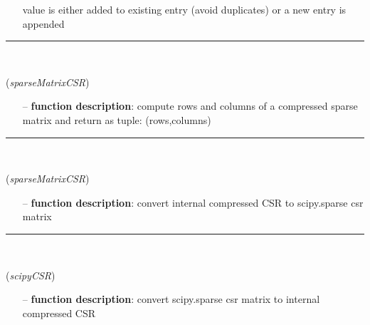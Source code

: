 \begin{itemize}[leftmargin=1.4cm]
\begin{itemize}[leftmargin=0.5cm]
\begin{itemize}[leftmargin=1.4cm]
\begin{itemize}[leftmargin=0.5cm]
\begin{itemize}[leftmargin=0.7cm]
\begin{itemize}[leftmargin=1.2cm]
    \item[] value is either added to existing entry (avoid duplicates) or a new entry is appended
  \end{itemize}
\vspace{12pt}\end{itemize}
%
\noindent\rule{8cm}{0.75pt}\vspace{1pt} \\ 
\begin{flushleft}
\label{sec:FEM:CSRtoRowsAndColumns}
({\it sparseMatrixCSR})
\end{flushleft}
\setlength{\itemindent}{0.7cm}
\begin{itemize}[leftmargin=0.7cm]
  \item[--]  {\bf function description}: compute rows and columns of a compressed sparse matrix and return as tuple: (rows,columns)\vspace{12pt}\end{itemize}
%
\noindent\rule{8cm}{0.75pt}\vspace{1pt} \\ 
\begin{flushleft}
\label{sec:FEM:CSRtoScipySparseCSR}
({\it sparseMatrixCSR})
\end{flushleft}
\setlength{\itemindent}{0.7cm}
\begin{itemize}[leftmargin=0.7cm]
  \item[--]  {\bf function description}: convert internal compressed CSR to scipy.sparse csr matrix\vspace{12pt}\end{itemize}
%
\noindent\rule{8cm}{0.75pt}\vspace{1pt} \\ 
\begin{flushleft}
\label{sec:FEM:ScipySparseCSRtoCSR}
({\it scipyCSR})
\end{flushleft}
\setlength{\itemindent}{0.7cm}
\begin{itemize}[leftmargin=0.7cm]
  \item[--]  {\bf function description}: convert scipy.sparse csr matrix to internal compressed CSR\vspace{12pt}\end{itemize}

\end{itemize}
\end{itemize}
\end{itemize}
\end{itemize}
